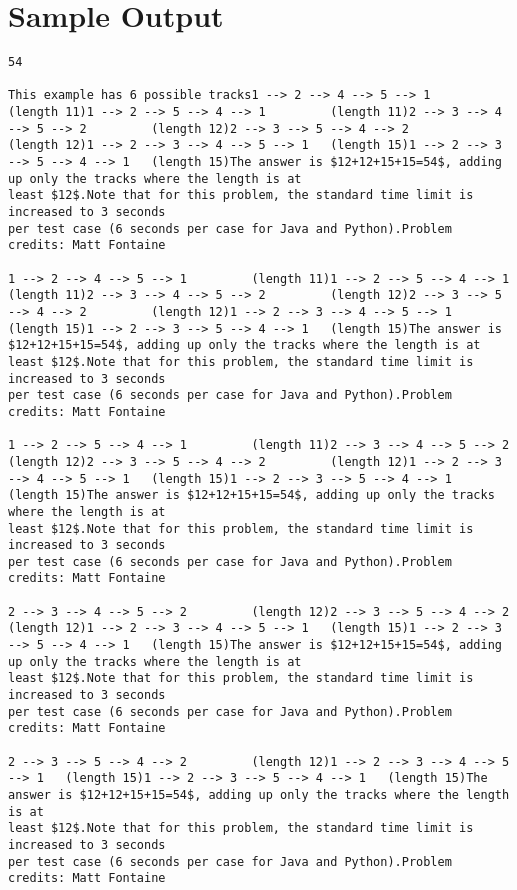 \documentclass[12pt]{article}
\begin{document}
\section*{Sample Output}
\begin{verbatim}
54

This example has 6 possible tracks1 --> 2 --> 4 --> 5 --> 1         (length 11)1 --> 2 --> 5 --> 4 --> 1         (length 11)2 --> 3 --> 4 --> 5 --> 2         (length 12)2 --> 3 --> 5 --> 4 --> 2         (length 12)1 --> 2 --> 3 --> 4 --> 5 --> 1   (length 15)1 --> 2 --> 3 --> 5 --> 4 --> 1   (length 15)The answer is $12+12+15+15=54$, adding up only the tracks where the length is at
least $12$.Note that for this problem, the standard time limit is increased to 3 seconds
per test case (6 seconds per case for Java and Python).Problem credits: Matt Fontaine

1 --> 2 --> 4 --> 5 --> 1         (length 11)1 --> 2 --> 5 --> 4 --> 1         (length 11)2 --> 3 --> 4 --> 5 --> 2         (length 12)2 --> 3 --> 5 --> 4 --> 2         (length 12)1 --> 2 --> 3 --> 4 --> 5 --> 1   (length 15)1 --> 2 --> 3 --> 5 --> 4 --> 1   (length 15)The answer is $12+12+15+15=54$, adding up only the tracks where the length is at
least $12$.Note that for this problem, the standard time limit is increased to 3 seconds
per test case (6 seconds per case for Java and Python).Problem credits: Matt Fontaine

1 --> 2 --> 5 --> 4 --> 1         (length 11)2 --> 3 --> 4 --> 5 --> 2         (length 12)2 --> 3 --> 5 --> 4 --> 2         (length 12)1 --> 2 --> 3 --> 4 --> 5 --> 1   (length 15)1 --> 2 --> 3 --> 5 --> 4 --> 1   (length 15)The answer is $12+12+15+15=54$, adding up only the tracks where the length is at
least $12$.Note that for this problem, the standard time limit is increased to 3 seconds
per test case (6 seconds per case for Java and Python).Problem credits: Matt Fontaine

2 --> 3 --> 4 --> 5 --> 2         (length 12)2 --> 3 --> 5 --> 4 --> 2         (length 12)1 --> 2 --> 3 --> 4 --> 5 --> 1   (length 15)1 --> 2 --> 3 --> 5 --> 4 --> 1   (length 15)The answer is $12+12+15+15=54$, adding up only the tracks where the length is at
least $12$.Note that for this problem, the standard time limit is increased to 3 seconds
per test case (6 seconds per case for Java and Python).Problem credits: Matt Fontaine

2 --> 3 --> 5 --> 4 --> 2         (length 12)1 --> 2 --> 3 --> 4 --> 5 --> 1   (length 15)1 --> 2 --> 3 --> 5 --> 4 --> 1   (length 15)The answer is $12+12+15+15=54$, adding up only the tracks where the length is at
least $12$.Note that for this problem, the standard time limit is increased to 3 seconds
per test case (6 seconds per case for Java and Python).Problem credits: Matt Fontaine


\end{verbatim}
\end{document}

